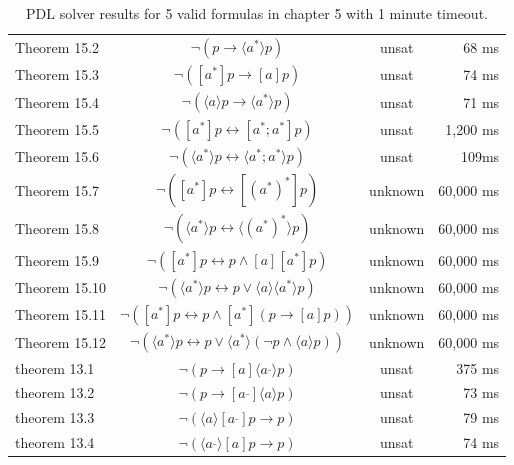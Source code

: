 \documentclass[12pt,a4paper]{article}
\begin{document}
\begin{table}[H]
\begin{tabular}{lccr}
Theorem 15.2 & $\neg (p \rightarrow   \langle  a^{*} \rangle   p)$  & unsat & 68 ms \\
	

Theorem 15.3 & $\neg ([a^{*}]p \rightarrow  [a]p)$  & unsat & 74 ms \\
	

Theorem 15.4 & $\neg ( \langle  a \rangle  p \rightarrow   \langle  a^{*} \rangle  p)$  & unsat  & 71 ms \\
	

Theorem 15.5 & $\neg ([a^{*}]p  \leftrightarrow  [a^{*};a^{*}]p)$  & unsat &  1,200 ms\\
	

Theorem 15.6 & $\neg ( \langle  a^{*} \rangle  p  \leftrightarrow   \langle  a^{*};a^{*} \rangle  p)$  & unsat & 109ms \\
	

Theorem 15.7 & $\neg ([a^{*}]p  \leftrightarrow  [(a^*)^*]p)$  & unknown   & 60,000 ms \\
	

Theorem 15.8 & $\neg ( \langle  a^{*} \rangle  p  \leftrightarrow   \langle  (a^*)^* \rangle  p)$  & unknown   & 60,000 ms \\
	

Theorem 15.9 & $\neg ([a^{*}]p  \leftrightarrow  p \wedge [a][a^{*}]p)$  & unknown   & 60,000 ms \\
	

Theorem 15.10 & $\neg ( \langle  a^{*} \rangle  p  \leftrightarrow  p \vee  \langle  a \rangle   \langle  a^{*} \rangle  p)$  & unknown   & 60,000 ms \\
	

Theorem 15.11 & $\neg ([a^{*}]p  \leftrightarrow  p \wedge [a^{*}](p \rightarrow  [a]p))$  & unknown   & 60,000 ms \\
	

Theorem 15.12 & $\neg ( \langle  a^{*} \rangle  p  \leftrightarrow  p \vee  \langle  a^{*} \rangle  (\neg  p \wedge  \langle  a \rangle  p))$  & unknown   & 60,000 ms \\
theorem 13.1 & $\neg (p \rightarrow  [a] \langle  a^{\_} \rangle  p)$  & unsat & 375 ms \\
theorem 13.2 & $\neg (p \rightarrow  [a^{\_}] \langle  a \rangle  p)$  & unsat & 73 ms \\
theorem 13.3 & $\neg ( \langle  a \rangle  [a^{\_}]p \rightarrow  p)$  & unsat & 79 ms \\
theorem 13.4 & $\neg ( \langle  a^{\_} \rangle  [a]p \rightarrow  p)$  & unsat & 74 ms \\  
\bottomrule 
\end{tabular}
\caption{PDL solver results for 5 valid formulas in chapter 5 with  1 minute timeout.}
\label{tab:benchmark}
\end{table}




\end{document}
